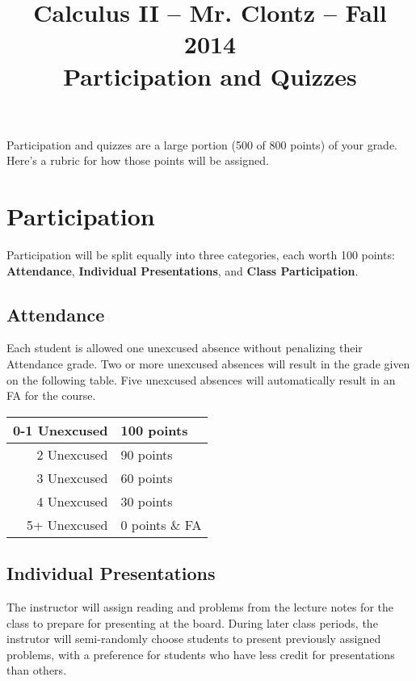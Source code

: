 \documentclass[11pt]{article}
\begin{document}
\title{Calculus II -- Mr. Clontz -- Fall 2014 \\ Participation and Quizzes}

\maketitle

Participation and quizzes are a large portion (500 of 800 points) of your
grade. Here's a rubric for how those points will be assigned.

\section{Participation}

Participation will be split equally into three categories, each worth 100
points: \textbf{Attendance}, \textbf{Individual Presentations}, and
\textbf{Class Participation}.

\subsection{Attendance}

Each student is allowed one unexcused absence without penalizing their
Attendance grade. Two or more unexcused absences will result in the grade given
on the following table. Five unexcused absences will automatically result in an
FA for the course.

\begin{center}
\begin{tabular}{rl}
0-1 Unexcused & 100 points \\\hline
2 Unexcused & 90 points \\\hline
3 Unexcused & 60 points \\\hline
4 Unexcused & 30 points \\\hline
5+ Unexcused & 0 points \& FA
\end{tabular}
\end{center}

\subsection{Individual Presentations}

The instructor will assign reading and problems from the lecture notes for the
class to prepare for presenting at the board. During later class periods,
the instrutor will semi-randomly choose students to present previously
assigned problems, with a preference for students who have less credit for
presentations than others.
\end{document}
